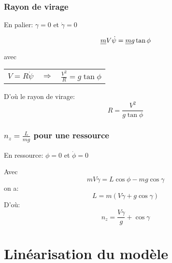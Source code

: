 \documentclass[tikz, footheight=2em]{beamer}
\begin{document}
\begin{frame}
    \frametitle{Rayon de virage}\pause{}
    En palier: \(\gamma = 0\) et \(\dot{\gamma} = 0\) \pause{}

    \[ \sout{m}V\dot{\psi} = \sout{m}g\tan \phi \] \pause{}
    avec

    \begin{center}
        \begin{tabular}{ccc}
            \(V = R\dot{\psi}\) & \(\Longrightarrow \) &
            \(\frac{V^2}{R} = g \tan \phi \)
        \end{tabular}
    \end{center}\pause{}

    D'où le rayon de virage:
    \[ \boxed{R = \frac{V^2}{g\tan \phi}}\]
\end{frame}


\begin{frame}
    \frametitle{\(n_z = \frac{L}{mg}\) pour une ressource}\pause{}
    En ressource: \(\phi = 0\) et \(\dot{\phi} = 0\)\pause{}

    Avec \[ mV\dot{\gamma} = L\cos \phi - mg \cos \gamma \]
    on a:\[ L = m(V\dot{\gamma} + g \cos \gamma)\] \pause{}
    D'où:\[ \boxed{n_z = \frac{V\dot{\gamma}}{g} + \cos \gamma}\]
\end{frame}

\section{Linéarisation du modèle}
\end{document}
